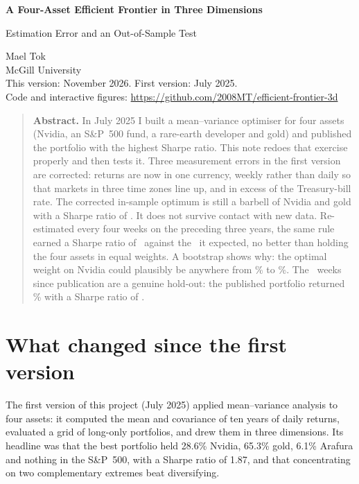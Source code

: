 \documentclass[11pt,a4paper]{article}
\begin{document}
\begin{center}
{\LARGE\bfseries A Four-Asset Efficient Frontier in Three Dimensions\par}
\vspace{0.3cm}
{\Large Estimation Error and an Out-of-Sample Test\par}
\vspace{0.6cm}
{\large Mael Tok}\\[2pt]
{\normalsize McGill University}\\[0.4cm]
{\normalsize This version: November 2026. First version: July 2025.}\\[2pt]
{\small Code and interactive figures: \url{https://github.com/2008MT/efficient-frontier-3d}}
\end{center}
\vspace{0.3cm}

\begin{quote}
\small
\textbf{Abstract.} In July 2025 I built a mean--variance optimiser for four assets (Nvidia, an S\&P~500 fund, a rare-earth developer and gold) and published the portfolio with the highest Sharpe ratio. This note redoes that exercise properly and then tests it. Three measurement errors in the first version are corrected: returns are now in one currency, weekly rather than daily so that markets in three time zones line up, and in excess of the Treasury-bill rate. The corrected in-sample optimum is still a barbell of Nvidia and gold with a Sharpe ratio of \msSharpe. It does not survive contact with new data. Re-estimated every four weeks on the preceding three years, the same rule earned a Sharpe ratio of \rollMs\ against the \rollExpected\ it expected, no better than holding the four assets in equal weights. A bootstrap shows why: the optimal weight on Nvidia could plausibly be anywhere from \bootNvdaLo\% to \bootNvdaHi\%. The \hoWeeks\ weeks since publication are a genuine hold-out: the published portfolio returned \hoVOneRet\% with a Sharpe ratio of \hoVOneSharpe.
\end{quote}

\section{What changed since the first version}

The first version of this project (July 2025) applied mean--variance analysis \citep{markowitz} to four assets: it computed the mean and covariance of ten years of daily returns, evaluated a grid of long-only portfolios, and drew them in three dimensions. Its headline was that the best portfolio held 28.6\% Nvidia, 65.3\% gold, 6.1\% Arafura and nothing in the S\&P~500, with a Sharpe ratio of 1.87, and that concentrating on two complementary extremes beat diversifying.
\end{document}
